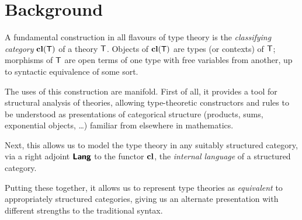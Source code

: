 
\section{Background}

\begin{para}
A fundamental construction in all flavours of type theory is the \emph{classifying category} $\mathbf{cl}(\mathsf{T})$ of a theory $\mathsf{T}$.  Objects of $\mathbf{cl}(\mathsf{T})$ are types (or contexts) of $\mathsf{T}$; morphisms of $\mathsf{T}$ are open terms of one type  with free variables from another, up to syntactic equivalence of some sort.

The uses of this construction are manifold.  First of all, it provides a tool for structural analysis of theories, allowing type-theoretic constructors and rules to be understood as presentations of categorical structure (products, sums, exponential objects, \ldots) familiar from elsewhere in mathematics.

Next, this allows us to model the type theory in any suitably structured category, via a right adjoint $\textbf{\textsf{Lang}}$ to the functor $\mathbf{cl}$, the \emph{internal language} of a structured category.

Putting these together, it allows us to represent type theories as \emph{equivalent} to appropriately structured categories, giving us an alternate presentation with different strengths to the traditional syntax.
\end{para}

